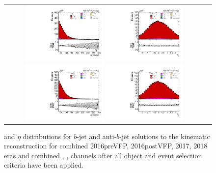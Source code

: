 \begin{figure}[htb]
    \begin{center}
        \begin{tabular}{cc}
            \includegraphics[width=0.40\textwidth]{fig_fullRun2UL/controlplots/combined/HypBJetpT.pdf}
            \includegraphics[width=0.40\textwidth]{fig_fullRun2UL/controlplots/combined/HypBJetEta.pdf} \\
            \includegraphics[width=0.40\textwidth]{fig_fullRun2UL/controlplots/combined/HypAntiBJetpT.pdf}
            \includegraphics[width=0.40\textwidth]{fig_fullRun2UL/controlplots/combined/HypAntiBJetEta.pdf} 
        \end{tabular}
        \caption{\footnotesize \pT and $\eta$ distributions for $b$-jet and anti-$b$-jet solutions to the kinematic reconstruction for combined 2016preVFP, 2016postVFP, 2017, 2018 eras and combined \ee, \emu, \mumu channels after all object and event selection criteria have been applied.
}
\end{center}
\end{figure}
